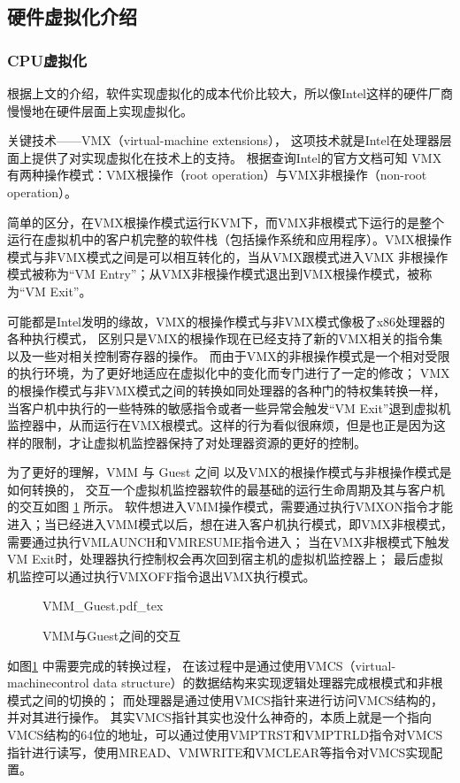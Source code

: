 \subsection{硬件虚拟化介绍}

\subsubsection{CPU虚拟化}
根据上文的介绍，软件实现虚拟化的成本代价比较大，所以像Intel这样的硬件厂商慢慢地在硬件层面上实现虚拟化。

关键技术——VMX（virtual-machine extensions），
这项技术就是Intel在处理器层面上提供了对实现虚拟化在技术上的支持。
根据查询Intel的官方文档\cite{Intel_VMX}可知 VMX有两种操作模式：VMX根操作（root operation）与VMX非根操作（non-root operation）。

简单的区分，在VMX根操作模式运行KVM下，而VMX非根模式下运行的是整个运行在虚拟机中的客户机完整的软件栈（包括操作系统和应用程序）。VMX根操作模式与非VMX模式之间是可以相互转化的，当从VMX跟模式进入VMX 非根操作模式被称为“VM Entry”；从VMX非根操作模式退出到VMX根操作模式，被称为“VM Exit”。

可能都是Intel发明的缘故，VMX的根操作模式与非VMX模式像极了x86处理器的各种执行模式，
区别只是VMX的根操作现在已经支持了新的VMX相关的指令集以及一些对相关控制寄存器的操作。
而由于VMX的非根操作模式是一个相对受限的执行环境，为了更好地适应在虚拟化中的变化而专门进行了一定的修改；
VMX的根操作模式与非VMX模式之间的转换如同处理器的各种门的特权集转换一样，当客户机中执行的一些特殊的敏感指令或者一些异常会触发“VM Exit”退到虚拟机监控器中，从而运行在VMX根模式。这样的行为看似很麻烦，但是也正是因为这样的限制，才让虚拟机监控器保持了对处理器资源的更好的控制。

为了更好的理解，VMM 与 Guest 之间 以及VMX的根操作模式与非根操作模式是如何转换的，
交互一个虚拟机监控器软件的最基础的运行生命周期及其与客户机的交互如图 \ref{fig:VMM_Guest} 所示。
软件想进入VMM操作模式，需要通过执行VMXON指令才能进入；当已经进入VMM模式以后，想在进入客户机执行模式，即VMX非根模式，需要通过执行VMLAUNCH和VMRESUME指令进入；
当在VMX非根模式下触发VM Exit时，处理器执行控制权会再次回到宿主机的虚拟机监控器上；
最后虚拟机监控可以通过执行VMXOFF指令退出VMX执行模式。

\begin{figure}[htbp]
    \centering
    \def\svgwidth{\columnwidth}
    {VMM_Guest.pdf_tex}
    \caption{VMM与Guest之间的交互}
    \label{fig:VMM_Guest}
\end{figure}


如图\ref{fig:VMM_Guest} 中需要完成的转换过程，
在该过程中是通过使用VMCS（virtual-machinecontrol data structure）的数据结构来实现逻辑处理器完成根模式和非根模式之间的切换的；
而处理器是通过使用VMCS指针来进行访问VMCS结构的，并对其进行操作。
其实VMCS指针其实也没什么神奇的，本质上就是一个指向VMCS结构的64位的地址，可以通过使用VMPTRST和VMPTRLD指令对VMCS指针进行读写，使用MREAD、VMWRITE和VMCLEAR等指令对VMCS实现配置。


